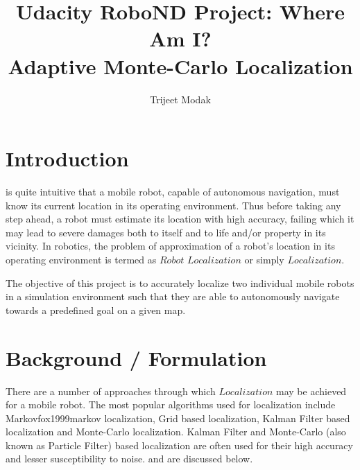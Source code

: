 \documentclass[10pt,journal,compsoc]{IEEEtran}
\begin{document}
\title{Udacity RoboND Project: Where Am I? \\
    \huge Adaptive Monte-Carlo Localization}

\author{Trijeet Modak}

%
{}


\maketitle
\IEEEdisplaynontitleabstractindextext
\IEEEpeerreviewmaketitle
\section{Introduction}
\label{sec:introduction}

 is quite intuitive that a mobile robot, capable of autonomous navigation, must know its current location in its operating environment. Thus before taking any step ahead, a robot must estimate its location with high accuracy, failing which it may lead to severe damages both to itself and to life and/or property in its vicinity. In robotics, the problem of approximation of a robot's location in its operating environment is termed as $Robot$  $Localization$ or simply $Localization$. 

The objective of this project is to accurately localize two individual mobile robots in a simulation environment such that they are able to autonomously navigate towards a predefined goal on a given map.

\section{Background / Formulation}
There are a number of approaches through which $Localization$ may be achieved for a mobile robot. The most popular algorithms used for localization include Markov\cite{}fox1999markov localization, Grid based\cite{vu2008grid} localization, Kalman Filter based\cite{chen2015fusion} localization and Monte-Carlo\cite{fox1999monte}\cite{dellaert1999monte} localization. Kalman Filter and Monte-Carlo (also known as Particle Filter) based localization are often used for their high accuracy and lesser susceptibility to noise. and are discussed below.
\end{document}
